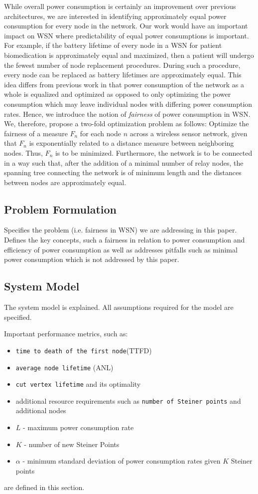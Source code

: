 While overall power consumption is certainly an improvement over previous architectures, we are interested in identifying approximately equal power consumption for every node in the network. Our work would have an important impact on WSN where predictability of equal power consumptions is important. For example, if the battery lifetime of every node in a WSN for patient biomedication is approximately equal and maximized, then a patient will undergo the fewest number of  node replacement procedures. During such a procedure, every node can be replaced as battery lifetimes are approximately equal. This idea differs from previous work in that power consumption of the network as a whole is equalized and optimized as opposed to only optimizing the power consumption which may leave individual nodes with differing power consumption rates. Hence, we introduce the notion of \textit{fairness} of power consumption in WSN. We, therefore, propose a two-fold optimization problem as follows:
Optimize the fairness of a measure $F_n$ for each node $n$ across a wireless sensor network, given that $F_n$ is exponentially related to a distance measure between neighboring nodes. Thus, $F_n$ is to be minimized. Furthermore, the network is to be connected in a way such that, after the addition of a minimal number of relay nodes, the spanning tree connecting the network is of minimum length and the distances between nodes are approximately equal.

\subsection{Problem Formulation}
Specifies the problem (i.e. fairness in WSN) we are addressing in this paper. Defines the key concepts, such a fairness in relation to power consumption and efficiency of power consumption as well as addresses pitfalls such as minimal power consumption which is not addressed by this paper.
\subsection{System Model}
The system model is explained. All assumptions required for the model are specified.

Important performance metrics, such as:
\begin{itemize}
\item \texttt{time to death of the first node}(TTFD)
\item \texttt{average node lifetime} (ANL)
\item \texttt{cut vertex lifetime} and its optimality
\item additional resource requirements such as \texttt{number of Steiner points} and additional nodes
\item $L$ - maximum power consumption rate
\item $K$ - number of new Steiner Points
\item $\alpha$ - minimum standard deviation of power consumption rates given $K$ Steiner points
\end{itemize}
are defined in this section.